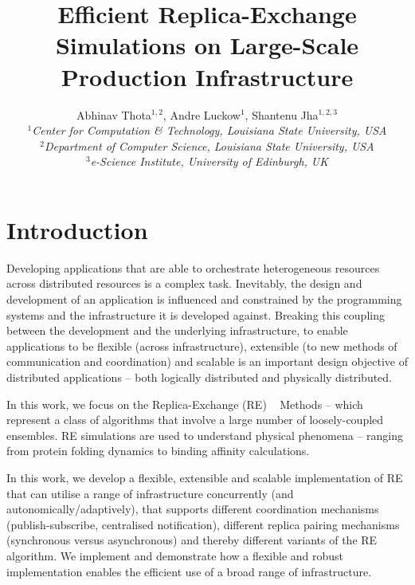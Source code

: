 \documentclass[a4paper,10pt]{article}
\begin{document}
\title{\LARGE Efficient Replica-Exchange Simulations on
  Large-Scale Production Infrastructure}

 

\author{Abhinav Thota$^{1,2}$, Andre Luckow$^{1}$, Shantenu Jha$^{1,2,3}$\\
   \small{\emph{$^{1}$Center for Computation \& Technology, Louisiana State University, USA}}\\
   \small{\emph{$^{2}$Department of Computer Science, Louisiana State University, USA}}\\
   \small{\emph{$^{3}$e-Science Institute, University of Edinburgh, UK}}
   }
 
\maketitle

\section{Introduction}
 
Developing applications that are able to orchestrate heterogeneous
resources across distributed resources is a complex task.  Inevitably,
the design and development of an application is influenced and
constrained by the programming systems and the infrastructure it is
developed against. Breaking this coupling between the development and
the underlying infrastructure, to enable applications to be flexible
(across infrastructure), extensible (to new methods of communication
and coordination) and scalable is an important design objective of
distributed applications -- both logically distributed and physically
distributed.

In this work, we focus on the Replica-Exchange (RE)
~\cite{hansmann,Sugita:1999rm} Methods -- which represent a class of
algorithms that involve a large number of loosely-coupled ensembles.
RE simulations are used to understand physical phenomena -- ranging
from protein folding dynamics to binding affinity calculations.

In this work, we develop a flexible, extensible and scalable
implementation of RE that can utilise a range of infrastructure
concurrently (and autonomically/adaptively), that supports different
coordination mechanisms (publish-subscribe, centralised notification),
different replica pairing mechanisms (synchronous versus asynchronous)
and thereby different variants of the RE algorithm. We implement and
demonstrate how a flexible and robust implementation enables the
efficient use of a broad range of infrastructure.
\end{document}
